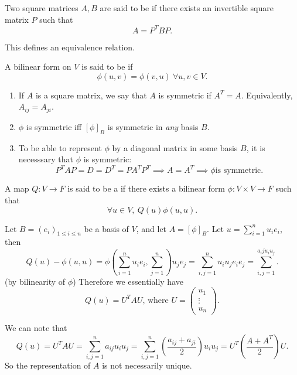 \documentclass[a4paper]{scrartcl}
\begin{document}
\begin{definition}
     Two square matrices $A,B$ are said to be  if there exists an invertible square matrix $P$ such that 
     \[A=P^T B P.\]
\end{definition}
\begin{remark}
     This defines an equivalence relation.
\end{remark}
\begin{definition}
     A bilinear form on $V$ is said to be  if 
     \[\phi(u,v)=\phi(v,u) \ \forall u,v \in V.\]
\end{definition}
\begin{remark}
    \begin{enumerate}
        \item If $A$ is a square matrix, we say that $A$ is symmetric if $A^T=A$. Equivalently, $A_{ij}=A_{ji}$.
        \item $\phi$ is symmetric iff $[\phi]_B$ is symmetric in \emph{any} basis $B$.
        \item To be able to represent $\phi$ by a diagonal matrix in some basis $B$, it is necesssary that $\phi$ is symmetric: 
        \[P^T AP=D=D^T=P A^T P^T \implies A=A^T \implies \phi \text{is symmetric} .\]
        
    \end{enumerate}
     
\end{remark}
\begin{definition}
     A map $Q: V \rightarrow F$ is said to be a  if there exists a bilinear form $\phi: V \times V \rightarrow F$ such that 
     \[\forall u \in V, \ Q(u)\phi (u,u).\]
\end{definition}
\begin{remark}
     Let $B=(e_i)_{1 \leq i \leq n}$ be a basis of $V$, and let $A=[\phi]_B$. Let $u=\sum_{i=1}^{n}u_i e_i$, then 
     \[Q (u)-\phi (u,u)=\phi (\sum_{i=1}^{n}u_i e_i, \sum_{j=1}^{n})u_j e_j=\sum_{i,j=1}^{n}u_i u_j e_i e_j=\sum_{i,j=1}^{a_ij u_i u_j}.\]
     (by bilinearity of $\phi$)
     Therefore we essentially have 
     \[Q (u)=U^T A U \text{, where } U=\begin{pmatrix}
     u_1\\\vdots \\ u_n
     \end{pmatrix}
     .\]
\end{remark}
\begin{remark}
     We can note that 
     \[Q (u)=U^T A U =\sum_{i,j=1}^{n}a_{ij}u_i u_j=\sum_{i,j=1}^{n}(\frac{a_{ij}+a_{ji}}{2})u_i u_j=U^T (\frac{A+A^T}{2}) U.\]
     So the representation of $A$ is not necessarily unique.
\end{remark}
\end{document}
